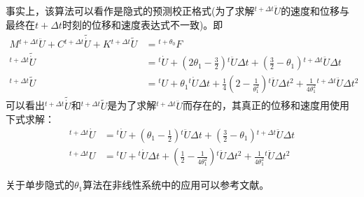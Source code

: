 事实上，该算法可以看作是隐式的预测校正格式(为了求解${^{t+\Delta t}\!\ddot{U}}$的速度和位移与最终在$t+\Delta t$时刻的位移和速度表达式不一致)。即
\begin{subequations}
\begin{align}
M{^{t+\Delta t}\!\ddot{U}}+C{^{t+\Delta t}\!\widetilde{\dot{U}}}+K{^{t+\Delta t}\!\widetilde{{U}}}&={^{t+\theta_0}\!F}\\
{^{t+\Delta t}\!\widetilde{\dot{U}}}&={^t\!\dot{U}}+(2\theta_1-\frac{3}{2}){^t\!\ddot{U}}\Delta t+(\frac{3}{2}-\theta_1){^{t+\Delta t}\!\ddot{U}}\Delta t\\
{^{t+\Delta t}\!\widetilde{{U}}}&={^t\!U}+\theta_1{^t\!\dot{U}}\Delta t+\frac{1}{4}(2-\frac{1}{\theta_1^2}){^t\!\ddot{U}}\Delta t^2+\frac{1}{4\theta_1^2}{^{t+\Delta t}\!\ddot{U}}\Delta t^2
\end{align}
\end{subequations}
可以看出${^{t+\Delta t}\!\widetilde{\dot{U}}}$和${^{t+\Delta t}\!\widetilde{{U}}}$是为了求解${^{t+\Delta t}\!\ddot{U}}$而存在的，其真正的位移和速度用使用下式求解：
\begin{subequations}
\begin{align}
{^{t+\Delta t}\!\dot{U}}&={^t\!\dot{U}}+(\theta_1-\frac{1}{2}){^t\!\ddot{U}}\Delta t+(\frac{3}{2}-\theta_1){^{t+\Delta t}\!\ddot{U}}\Delta t\\
{^{t+\Delta t}\!U}&={^t\!U}+{^t\!\dot{U}}\Delta t+(\frac12-\frac{1}{4\theta_1^2}){^t\!\ddot{U}}\Delta t^2+\frac{1}{4\theta_1^2}{^t\!\ddot{U}}\Delta t^2
\end{align}
\end{subequations}

关于单步隐式的$\theta_1$算法在非线性系统中的应用可以参考文献。




